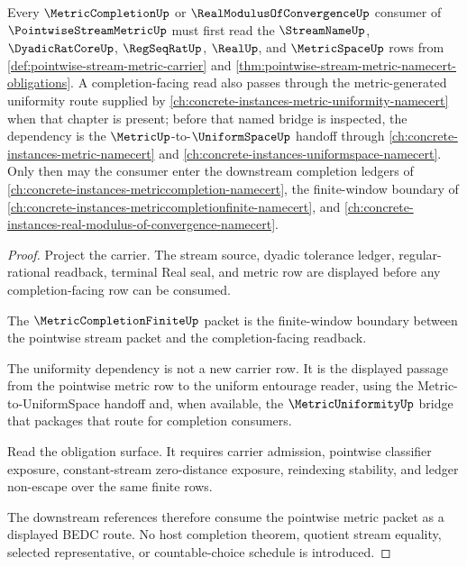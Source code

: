 \begin{theorem}
\label{thm:pointwise-stream-metric-sibling-orphan-repair-route}
Every $\MetricCompletionUp$ or $\RealModulusOfConvergenceUp$ consumer of $\PointwiseStreamMetricUp$ must first read the $\StreamNameUp$, $\DyadicRatCoreUp$, $\RegSeqRatUp$, $\RealUp$, and $\MetricSpaceUp$ rows from \autoref{def:pointwise-stream-metric-carrier} and \autoref{thm:pointwise-stream-metric-namecert-obligations}. A completion-facing read also passes through the metric-generated uniformity route supplied by \autoref{ch:concrete-instances-metric-uniformity-namecert} when that chapter is present; before that named bridge is inspected, the dependency is the $\MetricUp$-to-$\UniformSpaceUp$ handoff through \autoref{ch:concrete-instances-metric-namecert} and \autoref{ch:concrete-instances-uniformspace-namecert}. Only then may the consumer enter the downstream completion ledgers of \autoref{ch:concrete-instances-metriccompletion-namecert}, the finite-window boundary of \autoref{ch:concrete-instances-metriccompletionfinite-namecert}, and \autoref{ch:concrete-instances-real-modulus-of-convergence-namecert}.
\end{theorem}
\begin{proof}
Project the carrier. The stream source, dyadic tolerance ledger, regular-rational readback, terminal Real seal, and metric row are displayed before any completion-facing row can be consumed.

The $\MetricCompletionFiniteUp$ packet is the finite-window boundary between the pointwise stream packet and the completion-facing readback.

The uniformity dependency is not a new carrier row. It is the displayed passage from the pointwise metric row to the uniform entourage reader, using the Metric-to-UniformSpace handoff and, when available, the $\MetricUniformityUp$ bridge that packages that route for completion consumers.

Read the obligation surface. It requires carrier admission, pointwise classifier exposure, constant-stream zero-distance exposure, reindexing stability, and ledger non-escape over the same finite rows.

The downstream references therefore consume the pointwise metric packet as a displayed BEDC route. No host completion theorem, quotient stream equality, selected representative, or countable-choice schedule is introduced.
\end{proof}
